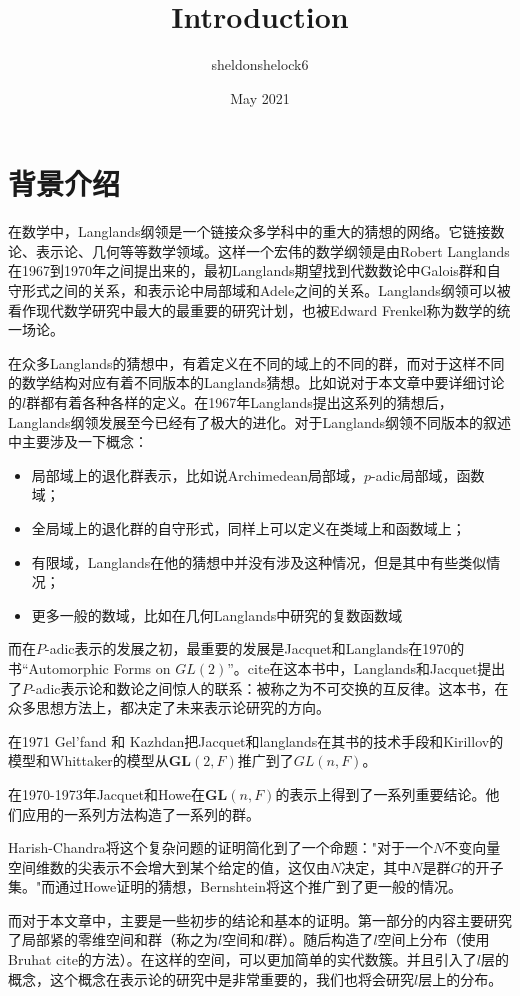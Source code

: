 \documentclass{article}
\title{Introduction}
\author{sheldonshelock6 }
\date{May 2021}
\begin{document}
\maketitle

\section{背景介绍}
在数学中，Langlands纲领是一个链接众多学科中的重大的猜想的网络。它链接数论、表示论、几何等等数学领域。这样一个宏伟的数学纲领是由Robert Langlands在1967到1970年之间提出来的，最初Langlands期望找到代数数论中Galois群和自守形式之间的关系，和表示论中局部域和Adele之间的关系。Langlands纲领可以被看作现代数学研究中最大的最重要的研究计划，也被Edward Frenkel称为数学的统一场论。


在众多Langlands的猜想中，有着定义在不同的域上的不同的群，而对于这样不同的数学结构对应有着不同版本的Langlands猜想。比如说对于本文章中要详细讨论的$l$群都有着各种各样的定义。在1967年Langlands提出这系列的猜想后，Langlands纲领发展至今已经有了极大的进化。对于Langlands纲领不同版本的叙述中主要涉及一下概念：
\begin{itemize}
    \item 局部域上的退化群表示，比如说Archimedean局部域，$p$-adic局部域，函数域；\item 全局域上的退化群的自守形式，同样上可以定义在类域上和函数域上；
    \item 有限域，Langlands在他的猜想中并没有涉及这种情况，但是其中有些类似情况；
    \item 更多一般的数域，比如在几何Langlands中研究的复数函数域
\end{itemize}

而在$P$-adic表示的发展之初，最重要的发展是Jacquet和Langlands在1970的书“Automorphic Forms on $GL(2)$”。cite在这本书中，Langlands和Jacquet提出了$P$-adic表示论和数论之间惊人的联系：被称之为不可交换的互反律。这本书，在众多思想方法上，都决定了未来表示论研究的方向。

在1971 Gel'fand 和 Kazhdan把Jacquet和langlands在其书的技术手段和Kirillov的模型和Whittaker的模型从$\mathbf{GL}(2,F)$推广到了$GL(n,F)$。

在1970-1973年Jacquet和Howe在$\mathbf{GL}(n,F)$的表示上得到了一系列重要结论。他们应用的一系列方法构造了一系列的群。

Harish-Chandra将这个复杂问题的证明简化到了一个命题："对于一个$N$不变向量空间维数的尖表示不会增大到某个给定的值，这仅由$N$决定，其中$N$是群$G$的开子集。"而通过Howe证明的猜想，Bernshtein将这个推广到了更一般的情况。

而对于本文章中，主要是一些初步的结论和基本的证明。第一部分的内容主要研究了局部紧的零维空间和群（称之为$l$空间和$l$群）。随后构造了$l$空间上分布（使用Bruhat cite的方法）。在这样的空间，可以更加简单的实代数簇。并且引入了$l$层的概念，这个概念在表示论的研究中是非常重要的，我们也将会研究$l$层上的分布。
\end{document}
